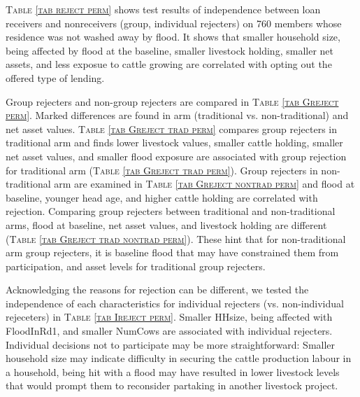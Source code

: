	\textsc{\normalsize Table \ref{tab reject perm}} shows test results of independence between loan receivers and nonreceivers (group, individual rejecters) on 760 members whose residence was not washed away by flood. It shows that smaller household size, being affected by flood at the baseline, smaller livestock holding, smaller net assets, and less exposue to cattle growing are correlated with opting out the offered type of lending. 
	
	Group rejecters and non-group rejecters are compared in \textsc{\normalsize Table \ref{tab Greject perm}}. Marked differences are found in arm (\textsf{traditional} vs. non-\textsf{traditional}) and net asset values. \textsc{\normalsize Table \ref{tab Greject trad perm}} compares group rejecters in \textsf{traditional} arm and finds lower livestock values, smaller cattle holding, smaller net asset values, and smaller flood exposure are associated with group rejection for \textsf{traditional} arm (\textsc{\normalsize Table \ref{tab Greject trad perm}}). Group rejecters in non-\textsf{traditional} arm are examined in \textsc{\normalsize Table \ref{tab Greject nontrad perm}} and flood at baseline, younger head age, and higher cattle holding are correlated with rejection. Comparing group rejecters between \textsf{traditional} and non-\textsf{traditional} arms, flood at baseline, net asset values, and livestock holding are different (\textsc{\normalsize Table \ref{tab Greject trad nontrad perm}}). These hint that for non-\textsf{traditional} arm group rejecters, it is baseline flood that may have constrained them from participation, and asset levels for \textsf{traditional} group rejecters.
	
	Acknowledging the reasons for rejection can be different, we tested the independence of each characteristics for individual rejecters (vs. non-individual rejeceters) in \textsc{\normalsize Table \ref{tab Ireject perm}}. Smaller \textsf{HHsize}, being affected with \textsf{FloodInRd1}, and smaller \textsf{NumCows} are associated with individual rejecters. Individual decisions not to participate may be more straightforward: Smaller household size may indicate difficulty in securing the cattle production labour in a household, being hit with a flood may have resulted in lower livestock levels that would prompt them to reconsider partaking in another livestock project. 

